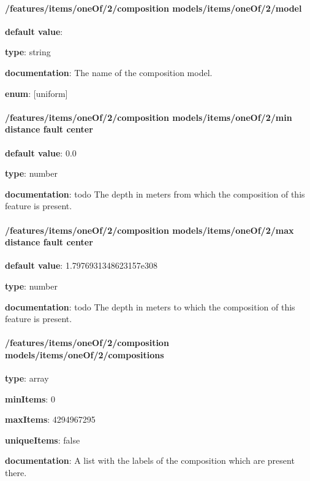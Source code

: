 \paragraph{/features/items/oneOf/2/composition models/items/oneOf/2/model} \begin{itemized}
\item {\bf default value}: 
\item {\bf type}: string
\item {\bf documentation}: The name of the composition model.
\item {\bf enum}: [uniform]\end{itemized}\paragraph{/features/items/oneOf/2/composition models/items/oneOf/2/min distance fault center} \begin{itemized}
\item {\bf default value}: 0.0
\item {\bf type}: number
\item {\bf documentation}: todo The depth in meters from which the composition of this feature is present.
\end{itemized}\paragraph{/features/items/oneOf/2/composition models/items/oneOf/2/max distance fault center} \begin{itemized}
\item {\bf default value}: 1.7976931348623157e308
\item {\bf type}: number
\item {\bf documentation}: todo The depth in meters to which the composition of this feature is present.
\end{itemized}\paragraph{/features/items/oneOf/2/composition models/items/oneOf/2/compositions} \begin{itemized}
\item {\bf type}: array
\item {\bf minItems}: 0
\item {\bf maxItems}: 4294967295
\item {\bf uniqueItems}: false
\item {\bf documentation}: A list with the labels of the composition which are present there.

\end{itemized}

